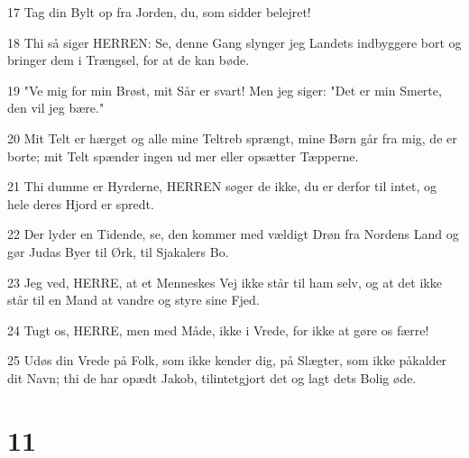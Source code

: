 \par 17 Tag din Bylt op fra Jorden, du, som sidder belejret!
\par 18 Thi så siger HERREN: Se, denne Gang slynger jeg Landets indbyggere bort og bringer dem i Trængsel, for at de kan bøde.
\par 19 "Ve mig for min Brøst, mit Sår er svart! Men jeg siger: "Det er min Smerte, den vil jeg bære."
\par 20 Mit Telt er hærget og alle mine Teltreb sprængt, mine Børn går fra mig, de er borte; mit Telt spænder ingen ud mer eller opsætter Tæpperne.
\par 21 Thi dumme er Hyrderne, HERREN søger de ikke, du er derfor til intet, og hele deres Hjord er spredt.
\par 22 Der lyder en Tidende, se, den kommer med vældigt Drøn fra Nordens Land og gør Judas Byer til Ørk, til Sjakalers Bo.
\par 23 Jeg ved, HERRE, at et Menneskes Vej ikke står til ham selv, og at det ikke står til en Mand at vandre og styre sine Fjed.
\par 24 Tugt os, HERRE, men med Måde, ikke i Vrede, for ikke at gøre os færre!
\par 25 Udøs din Vrede på Folk, som ikke kender dig, på Slægter, som ikke påkalder dit Navn; thi de har opædt Jakob, tilintetgjort det og lagt dets Bolig øde.

\chapter{11}

